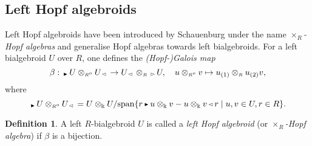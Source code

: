 \documentclass[reqno, a4paper, 10pt]{amsart}
\numberwithin{equation}{section}
\theoremstyle{plain}
\theoremstyle{definition}
\newtheorem{dfn}[theorem]{Definition}
\theoremstyle{remark}
\begin{document}
\subsection{Left Hopf algebroids} {\cite{Schau:DADOQGHA}}
Left Hopf algebroids have been
introduced by Schauenburg 
under the name {\em $\times_{{\scriptscriptstyle{R}}}$-Hopf
algebras} and 
generalise Hopf 
algebras towards left bialgebroids.
For a left bialgebroid $U$ over $R$, one
defines the
{\em (Hopf-)Galois map} 
\begin{equation*}
\label{Galois}
\beta: {}_{{\,\raise1pt\hbox{$\scriptscriptstyle{\blacktriangleright}$} \, }} U \otimes_{{\scriptscriptstyle{{R^{o}}}}} U_{{\,\raise1pt\hbox{$\scriptscriptstyle{\lhd}$} \, }} \to 
U_{{\,\raise1pt\hbox{$\scriptscriptstyle{\lhd}$} \, }} \otimes_{{\scriptscriptstyle{R}}} {}_{{\,\raise1pt\hbox{$\scriptscriptstyle{\rhd}$} \, }} U, \quad u
\otimes_{{\scriptscriptstyle{{R^{o}}}}} v \mapsto  
u_{(1)}  \otimes_{{\scriptscriptstyle{R}}} u_{(2)}v, 
\end{equation*}
where 
\begin{equation}
\label{tata}
 {}_{{\,\raise1pt\hbox{$\scriptscriptstyle{\blacktriangleright}$} \, }} U \otimes_{{\scriptscriptstyle{{R^{o}}}}} U_{{\,\raise1pt\hbox{$\scriptscriptstyle{\lhd}$} \, }} = U
 \otimes_{\Bbbk} U/
{{\rm
 span}\{r {{\,\raise1pt\hbox{$\scriptscriptstyle{\blacktriangleright}$} \, }} u \otimes_{\Bbbk} v - u
 \otimes_{\Bbbk} v {{\,\raise1pt\hbox{$\scriptscriptstyle{\lhd}$} \, }} r \mid
u,v \in U, r \in R \}}.
\end{equation}

\begin{dfn}\cite{Schau:DADOQGHA}
\label{hopftimesleft}
A left $R$-bialgebroid $U$ is 
called a 
{\em left Hopf algebroid} 
(or {\em $\times_{{\scriptscriptstyle{R}}}$-Hopf algebra}) if
$\beta$ is a bijection. 
\end{dfn}
\end{document}
